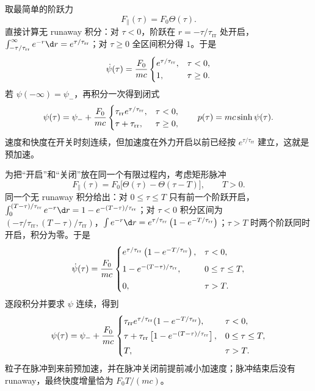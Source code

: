 取最简单的阶跃力
\begin{equation*}
 F_\parallel(\tau)=F_0\Theta(\tau).
\end{equation*}
直接计算无 runaway 积分：对 $\tau<0$，阶跃在 $r=-\tau/\tau_{\mathrm{rr}}$ 处开启，$\int_{-\tau/\tau_{\mathrm{rr}}}^{\infty}e^{-r}\d r=e^{\tau/\tau_{\mathrm{rr}}}$；对 $\tau\geq0$ 全区间积分得 $1$。于是
\begin{equation*}
 \dot\psi(\tau)
 ={F_0\over mc}
 \begin{cases}
 e^{\tau/\tau_{\mathrm{rr}}},&\tau<0,\\
 1,&\tau\geq0.
 \end{cases}
\end{equation*}
若 $\psi(-\infty)=\psi_-$，再积分一次得到闭式
\begin{equation*}
 \psi(\tau)=\psi_-+{F_0\over mc}
 \begin{cases}
 \tau_{\mathrm{rr}}e^{\tau/\tau_{\mathrm{rr}}},&\tau<0,\\
 \tau+\tau_{\mathrm{rr}},&\tau\geq0,
 \end{cases}
 \qquad
 p(\tau)=mc\sinh\psi(\tau).
\end{equation*}
速度和快度在开关时刻连续，但加速度在外力开启以前已经按 $e^{\tau/\tau_{\mathrm{rr}}}$ 建立，这就是预加速。

为把“开启”和“关闭”放在同一个有限过程内，考虑矩形脉冲
\begin{equation*}
 F_\parallel(\tau)=F_0\bigl[\Theta(\tau)-\Theta(\tau-T)\bigr],
 \qquad T>0.
\end{equation*}
同一个无 runaway 积分给出：对 $0\leq\tau\leq T$ 只有前一个阶跃开启，$\int_0^{(T-\tau)/\tau_{\mathrm{rr}}}e^{-r}\d r=1-e^{-(T-\tau)/\tau_{\mathrm{rr}}}$；对 $\tau<0$ 积分区间为 $(-\tau/\tau_{\mathrm{rr}},(T-\tau)/\tau_{\mathrm{rr}})$，$\int e^{-r}\d r=e^{\tau/\tau_{\mathrm{rr}}}\left(1-e^{-T/\tau_{\mathrm{rr}}}\right)$；$\tau>T$ 时两个阶跃同时开启，积分为零。于是
\begin{equation*}
 \dot\psi(\tau)={F_0\over mc}
 \begin{cases}
 e^{\tau/\tau_{\mathrm{rr}}}
 \left(1-e^{-T/\tau_{\mathrm{rr}}}\right),&\tau<0,\\[2mm]
 1-e^{-(T-\tau)/\tau_{\mathrm{rr}}},&0\leq\tau\leq T,\\[2mm]
 0,&\tau>T.
 \end{cases}
\end{equation*}
逐段积分并要求 $\psi$ 连续，得到
\begin{equation*}
 \psi(\tau)=\psi_-+{F_0\over mc}
 \begin{cases}
 \tau_{\mathrm{rr}}e^{\tau/\tau_{\mathrm{rr}}}
 (1-e^{-T/\tau_{\mathrm{rr}}}),&\tau<0,\\[1mm]
 \tau+\tau_{\mathrm{rr}}
 \left[1-e^{-(T-\tau)/\tau_{\mathrm{rr}}}\right],&0\leq\tau\leq T,\\[1mm]
 T,&\tau>T.
 \end{cases}
\end{equation*}
粒子在脉冲到来前预加速，并在脉冲关闭前提前减小加速度；脉冲结束后没有 runaway，最终快度增量恰为 $F_0T/(mc)$。

